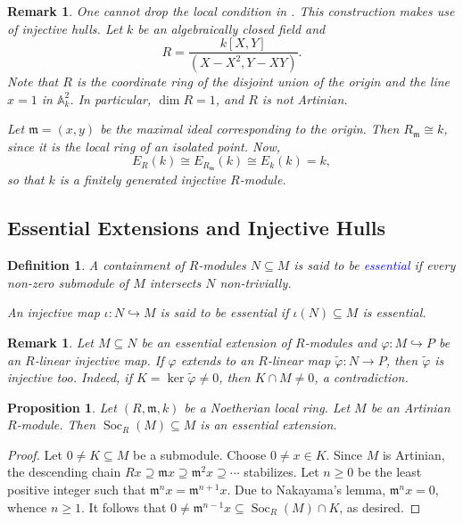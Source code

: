 \documentclass[10pt]{article}
\theoremstyle{thmstyle}
\newtheorem{proposition}[theorem]{Proposition}
\theoremstyle{defstyle}
\newtheorem{definition}[theorem]{Definition}
\newtheorem{remark}[theorem]{Remark}
\newcommand{\bbA}{\mathbb{A}} %
\newcommand{\frakm}{\mathfrak{m}} %
\newcommand{\wt}[1]{\widetilde{#1}}
\newcommand{\into}{\hookrightarrow}
\newcommand{\define}[1]{\textcolor{blue}{\textit{#1}}}
\renewcommand{\ge}{\geqslant}
\newcommand{\Soc}{\operatorname{Soc}}
\begin{document}
\begin{remark}
    One cannot drop the local condition in . This construction makes use of injective hulls. Let $k$ be an algebraically closed field and 
    \begin{equation*}
        R = \frac{k[X, Y]}{(X - X^2, Y - XY)}.
    \end{equation*}
    Note that $R$ is the coordinate ring of the disjoint union of the origin and the line $x = 1$ in $\bbA_k^2$. In particular, $\dim R = 1$, and $R$ is not Artinian.
    
    Let $\frakm = (x, y)$ be the maximal ideal corresponding to the origin. Then $R_{\frakm}\cong k$, since it is the local ring of an isolated point. Now, 
    \begin{equation*}
        E_R(k)\cong E_{R_\frakm}(k)\cong E_k(k) = k,
    \end{equation*}
    so that $k$ is a finitely generated injective $R$-module.
\end{remark}

\subsection{Essential Extensions and Injective Hulls}


\begin{definition}
    A containment of $R$-modules $N\subseteq M$ is said to be \define{essential} if every non-zero submodule of $M$ intersects $N$ non-trivially.

    An injective map $\iota: N\into M$ is said to be essential if $\iota(N)\subseteq M$ is essential.
\end{definition}

\begin{remark}
    Let $M\subseteq N$ be an essential extension of $R$-modules and $\varphi: M\into P$ be an $R$-linear injective map. If $\varphi$ extends to an $R$-linear map $\wt\varphi: N\to P$, then $\wt\varphi$ is injective too. Indeed, if $K = \ker\wt\varphi\ne 0$, then $K\cap M\ne 0$, a contradiction.
\end{remark}

\begin{proposition}
    Let $(R,\frakm, k)$ be a Noetherian local ring. Let $M$ be an Artinian $R$-module. Then $\Soc_R(M)\subseteq M$ is an essential extension.
\end{proposition}
\begin{proof}
    Let $0\ne K\subseteq M$ be a submodule. Choose $0\ne x\in K$. Since $M$ is Artinian, the descending chain $Rx\supseteq\frakm x\supseteq\frakm^2 x\supseteq\cdots$ stabilizes. Let $n\ge 0$ be the least positive integer such that $\frakm^n x = \frakm^{n + 1}x$. Due to Nakayama's lemma, $\frakm^n x = 0$, whence $n\ge 1$. It follows that $0\ne\frakm^{n  - 1}x\subseteq\Soc_R(M)\cap K$, as desired.
\end{proof}
\end{document}
